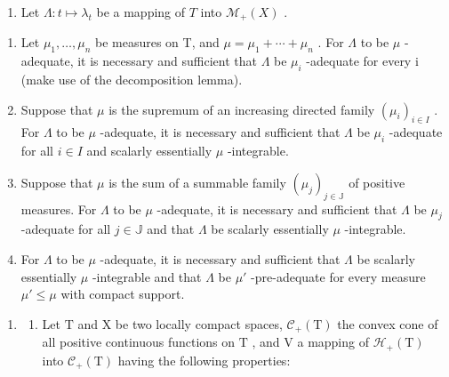 \begin{enumerate}
\def\labelenumi{\arabic{enumi})}
\setcounter{enumi}{7}
\tightlist
\item
  Let \(\Lambda : t \mapsto \lambda_t\) be a mapping of \(T\) into \(\mathcal{M}_+(X)\) .
\end{enumerate}

\begin{enumerate}
\def\labelenumi{\alph{enumi})}
\item
  Let \(\mu_{1},\ldots,\mu_{n}\) be measures on T, and \(\mu=\mu_{1}+\cdots+\mu_{n}\) . For \(\Lambda\) to be \(\mu\) -adequate, it is necessary and sufficient that \(\Lambda\) be \(\mu_{i}\) -adequate for every i (make use of the decomposition lemma).
\item
  Suppose that \(\mu\) is the supremum of an increasing directed family \((\mu_i)_{i \in I}\) . For \(\Lambda\) to be \(\mu\) -adequate, it is necessary and sufficient that \(\Lambda\) be \(\mu_i\) -adequate for all \(i \in I\) and scalarly essentially \(\mu\) -integrable.
\item
  Suppose that \(\mu\) is the sum of a summable family \((\mu_j)_{j \in \mathbb{J}}\) of positive measures. For \(\Lambda\) to be \(\mu\) -adequate, it is necessary and sufficient that \(\Lambda\) be \(\mu_j\) -adequate for all \(j \in \mathbb{J}\) and that \(\Lambda\) be scalarly essentially \(\mu\) -integrable.
\item
  For \(\Lambda\) to be \(\mu\) -adequate, it is necessary and sufficient that \(\Lambda\) be scalarly essentially \(\mu\) -integrable and that \(\Lambda\) be \(\mu'\) -pre-adequate for every measure \(\mu' \leqslant \mu\) with compact support.
\end{enumerate}

\begin{enumerate}
\def\labelenumi{\arabic{enumi})}
\setcounter{enumi}{8}
\tightlist
\item
  \begin{enumerate}
  \def\labelenumii{\alph{enumii})}
  \tightlist
  \item
    Let \(\mathrm{T}\) and \(\mathrm{X}\) be two locally compact spaces, \(\mathcal{C}_{+}(\mathrm{T})\) the convex cone of all positive continuous functions on \(\mathrm{T}\) , and \(\mathrm{V}\) a mapping of \(\mathcal{H}_{+}(\mathrm{T})\) into \(\mathcal{C}_{+}(\mathrm{T})\) having the following properties:
  \end{enumerate}
\end{enumerate}

